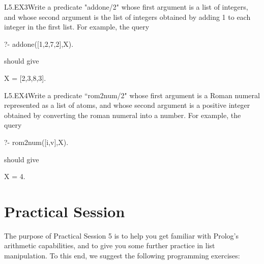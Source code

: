 \clearpage
\begin{LPNexercise}{L5.EX3}Write a predicate
"addone/2" whose first argument is a list of integers, and whose
second argument is the list of integers obtained by adding 1 to each
integer in the first list.  For example, the query
\begin{LPNcodedisplay}
?- addone([1,2,7,2],X).
\end{LPNcodedisplay}
should give
\begin{LPNcodedisplay}
X = [2,3,8,3].
\end{LPNcodedisplay}
\end{LPNexercise}

\begin{LPNexercise}{L5.EX4}Write a predicate
``rom2num/2" whose first argument is a Roman numeral represented as a list of atoms, and whose
second argument is a positive integer obtained by converting the roman numeral into a number.
For example, the query
\begin{LPNcodedisplay}
?- rom2num([i,v],X).
\end{LPNcodedisplay}
should give
\begin{LPNcodedisplay}
X = 4.
\end{LPNcodedisplay}
\end{LPNexercise}


\section{Practical Session}\label{SEC.L5.PRAXIS}



The purpose of Practical Session 5 is to help you get familiar with
Prolog's arithmetic capabilities, and to give you some further
practice in list manipulation. To this end, we suggest the following
programming exercises:

